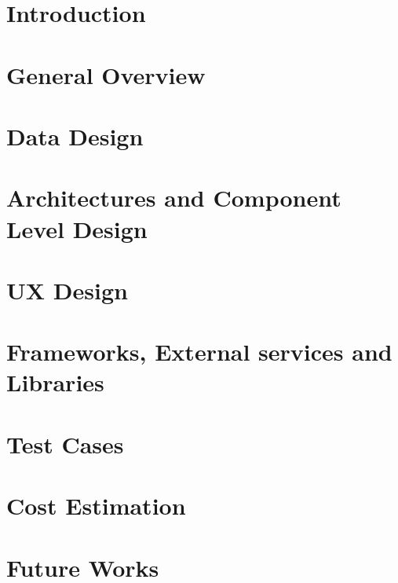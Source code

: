\documentclass[a4paper,12pt]{report}
\begin{document}
\setcounter{tocdepth}{1}
\tableofcontents

\chapter{Introduction}

\clearpage

\chapter{General Overview}

\clearpage

\chapter{Data Design}
%
\clearpage

\chapter{Architectures and Component Level Design}
%
\clearpage

\chapter{UX Design}
\clearpage

\chapter{Frameworks, External services and Libraries}

\clearpage

\chapter{Test Cases}
\clearpage

\chapter{Cost Estimation}
\clearpage

\chapter{Future Works}
%
\clearpage
\end{document}
